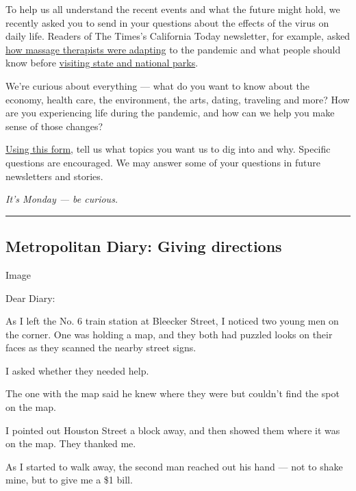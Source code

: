 To help us all understand the recent events and what the future might
hold, we recently asked you to send in your questions about the effects
of the virus on daily life. Readers of The Times's California Today
newsletter, for example, asked
\href{https://www.nytimes3xbfgragh.onion/2020/07/31/us/essential-workers-massage-therapists.html}{how
massage therapists were adapting} to the pandemic and what people should
know before
\href{https://www.nytimes3xbfgragh.onion/2020/07/13/us/california-parks-coronavirus.html}{visiting
state and national parks}.

We're curious about everything --- what do you want to know about the
economy, health care, the environment, the arts, dating, traveling and
more? How are you experiencing life during the pandemic, and how can we
help you make sense of those changes?

\href{https://www.nytimes3xbfgragh.onion/2019/09/17/reader-center/coronavirus-nyc-questions.html}{Using
this form}, tell us what topics you want us to dig into and why.
Specific questions are encouraged. We may answer some of your questions
in future newsletters and stories.

\emph{It's Monday --- be curious.}

\begin{center}\rule{0.5\linewidth}{\linethickness}\end{center}

\hypertarget{metropolitan-diary-giving-directions}{%
\subsection{Metropolitan Diary: Giving
directions}\label{metropolitan-diary-giving-directions}}

Image

Dear Diary:

As I left the No. 6 train station at Bleecker Street, I noticed two
young men on the corner. One was holding a map, and they both had
puzzled looks on their faces as they scanned the nearby street signs.

I asked whether they needed help.

The one with the map said he knew where they were but couldn't find the
spot on the map.

I pointed out Houston Street a block away, and then showed them where it
was on the map. They thanked me.

As I started to walk away, the second man reached out his hand --- not
to shake mine, but to give me a \$1 bill.

